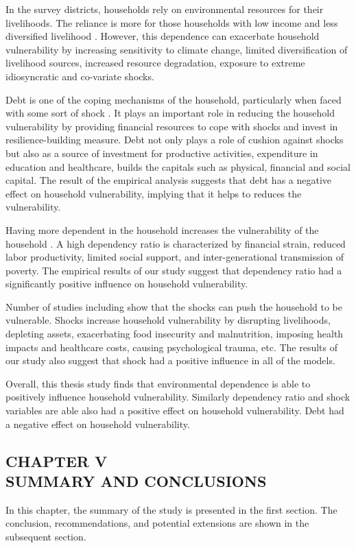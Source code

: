 \documentclass[12pt, a4paper]{article}
\begin{document}
In the survey districts, households rely on environmental resources for their livelihoods. The reliance is more for those households with low income and less diversified livelihood \citep{walelign2020environmental}. However, this dependence can exacerbate household vulnerability by increasing sensitivity to climate change, limited diversification of livelihood sources, increased resource degradation, exposure to extreme idiosyncratic and co-variate shocks.

Debt is one of the coping mechanisms of the household, particularly when faced with some sort of shock \citep{rabbani2021role}. It plays an important role in reducing the household vulnerability by providing financial resources to cope with shocks and invest in resilience-building measure. Debt not only plays a role of cushion against shocks but also as a source of investment for productive activities, expenditure in education and healthcare, builds the capitals such as physical, financial and social capital. The result of the empirical analysis suggests that debt has a negative effect on household vulnerability, implying that it helps to reduces the vulnerability.



Having more dependent in the household increases the vulnerability of the household \citep{rabbani2021role, sun2020nexus}. A high dependency ratio is characterized by financial strain, reduced labor productivity, limited social support, and inter-generational transmission of poverty.  The empirical results of our study suggest that dependency ratio had a significantly positive influence on household vulnerability.


Number of studies including \cite{buhler2018shocks, barua2020impact, volker2010rural} show that the shocks can push the household to be vulnerable. Shocks increase household vulnerability by disrupting livelihoods, depleting assets, exacerbating food insecurity and malnutrition, imposing health impacts and healthcare costs, causing psychological trauma, etc. The results of our study also suggest that shock had a positive influence in all of the models.

Overall, this thesis study finds that environmental dependence is able to positively influence household vulnerability. Similarly dependency ratio and shock variables are able also had a positive effect on household vulnerability. Debt had a negative effect on household vulnerability.   
 
  
   
            
\clearpage
\begin{center}
\section*{\large{CHAPTER V \\ \vspace{-0.3cm} SUMMARY AND CONCLUSIONS}}
\end{center}
\renewcommand{\thepage}{\arabic{page}}
In this chapter, the summary of the study is presented in the first section. The conclusion, recommendations, and potential extensions are shown in the subsequent
section. \\
\end{document}
